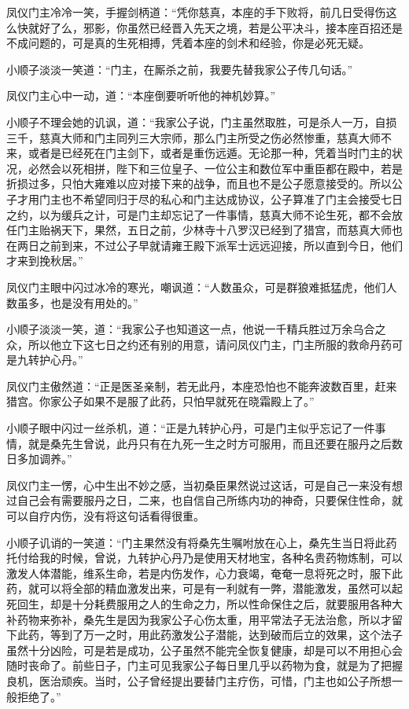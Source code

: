 凤仪门主冷冷一笑，手握剑柄道：“凭你慈真，本座的手下败将，前几日受得伤这么快就好了么，邪影，你虽然已经晋入先天之境，若是公平决斗，接本座百招还是不成问题的，可是真的生死相搏，凭着本座的剑术和经验，你是必死无疑。

小顺子淡淡一笑道：“门主，在厮杀之前，我要先替我家公子传几句话。”

凤仪门主心中一动，道：“本座倒要听听他的神机妙算。”

小顺子不理会她的讥讽，道：“我家公子说，门主虽然取胜，可是杀人一万，自损三千，慈真大师和门主同列三大宗师，那么门主所受之伤必然惨重，慈真大师不来，或者是已经死在门主剑下，或者是重伤远遁。无论那一种，凭着当时门主的状况，必然会以死相拼，陛下和三位皇子、一位公主和数位军中重臣都在殿中，若是折损过多，只怕大雍难以应对接下来的战争，而且也不是公子愿意接受的。所以公子才用门主也不希望同归于尽的私心和门主达成协议，公子算准了门主会接受七日之约，以为缓兵之计，可是门主却忘记了一件事情，慈真大师不论生死，都不会放任门主贻祸天下，果然，五日之前，少林寺十八罗汉已经到了猎宫，而慈真大师也在两日之前到来，不过公子早就请雍王殿下派军士远远迎接，所以直到今日，他们才来到挽秋居。”

凤仪门主眼中闪过冰冷的寒光，嘲讽道：“人数虽众，可是群狼难抵猛虎，他们人数虽多，也是没有用处的。”

小顺子淡淡一笑，道：“我家公子也知道这一点，他说一千精兵胜过万余乌合之众，所以他立下这七日之约还有别的用意，请问凤仪门主，门主所服的救命丹药可是九转护心丹。”

凤仪门主傲然道：“正是医圣亲制，若无此丹，本座恐怕也不能奔波数百里，赶来猎宫。你家公子如果不是服了此药，只怕早就死在晓霜殿上了。”

小顺子眼中闪过一丝杀机，道：“正是九转护心丹，可是门主似乎忘记了一件事情，就是桑先生曾说，此丹只有在九死一生之时方可服用，而且还要在服丹之后数日多加调养。”

凤仪门主一愣，心中生出不妙之感，当初桑臣果然说过这话，可是自己一来没有想过自己会有需要服丹之日，二来，也自信自己所练内功的神奇，只要保住性命，就可以自疗内伤，没有将这句话看得很重。

小顺子讥诮的一笑道：“门主果然没有将桑先生嘱咐放在心上，桑先生当日将此药托付给我的时候，曾说，九转护心丹乃是使用天材地宝，各种名贵药物炼制，可以激发人体潜能，维系生命，若是内伤发作，心力衰竭，奄奄一息将死之时，服下此药，就可以将全部的精血激发出来，可是有一利就有一弊，潜能激发，虽然可以起死回生，却是十分耗费服用之人的生命之力，所以性命保住之后，就要服用各种大补药物来弥补，桑先生是因为我家公子心伤太重，用平常法子无法治愈，所以才留下此药，等到了万一之时，用此药激发公子潜能，达到破而后立的效果，这个法子虽然十分凶险，可是若是成功，公子虽然不能完全恢复健康，却是可以不用担心会随时丧命了。前些日子，门主可见我家公子每日里几乎以药物为食，就是为了把握良机，医治顽疾。当时，公子曾经提出要替门主疗伤，可惜，门主也如公子所想一般拒绝了。”

